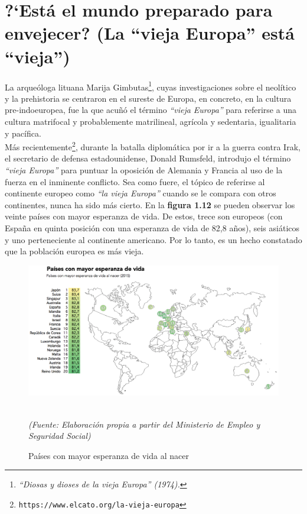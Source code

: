 \section{?`Est\'a el mundo preparado para envejecer? (La ``vieja Europa'' est\'a ``vieja'')}

La arque\'ologa lituana Marija Gimbutas\footnote{\textit{``Diosas y dioses de la vieja Europa'' (1974).}}, cuyas investigaciones sobre el neol\'itico y la prehistoria se centraron en el sureste de Europa, en concreto, en la cultura pre-indoeuropea, fue la que acu\~n\'o el t\'ermino \textit{``vieja Europa''} para referirse a una cultura matrifocal y probablemente matrilineal, agr\'icola y sedentaria, igualitaria y pac\'ifica.\\ 
M\'as recientemente\footnote{\texttt{https://www.elcato.org/la-vieja-europa}}, durante la batalla diplom\'atica por ir a la guerra contra Irak, el secretario de defensa estadounidense, Donald Rumsfeld, introdujo el t\'ermino \textit{``vieja Europa''} para puntuar la oposici\'on de Alemania y Francia al uso de la fuerza en el inminente conflicto. Sea como fuere, el t\'opico de referirse al continente europeo como \textit{``la vieja Europa''} cuando se le compara con otros continentes, nunca ha sido m\'as cierto. En la \textbf{figura 1.12} se pueden observar los veinte pa\'ises con mayor esperanza de vida. De estos, trece son europeos (con Espa\~na en quinta posici\'on con una esperanza de vida de 82,8 a\~nos), seis asi\'aticos y uno perteneciente al continente americano. Por lo tanto, es un hecho constatado que la poblaci\'on europea es m\'as vieja. 
\vspace{-0.3cm}
\begin{figure}[H]
\centering
\hspace*{-0.75cm}
\includegraphics[scale=0.33]{Cap1/lifeexpectancy.png}
\caption{Pa\'ises con mayor esperanza de vida al nacer}\\
\textit{(Fuente: Elaboraci\'on propia a partir del Ministerio de Empleo y Seguridad Social)}
\end{figure}

